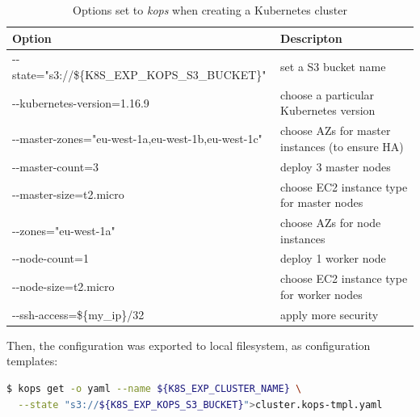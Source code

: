 \begin{table}[H]
\captionsetup{justification=centering}
\caption{\label{tab:kops-production-options}Options set to \textit{kops} when creating a Kubernetes cluster}
\small
\begin{tabularx}{1\textwidth} {
  | >{\centering\arraybackslash}X
  | >{\centering\arraybackslash}X | }
 \hline
  \textbf{Option} & \textbf{Descripton}  \\
 \hline
 -{}-state="s3://\$\{K8S\_EXP\_KOPS\_S3\_BUCKET\}"  & set a S3 bucket name \\
 \hline
 -{}-kubernetes-version=1.16.9  & choose a particular Kubernetes version \\
 \hline
 -{}-master-zones="eu-west-1a,eu-west-1b,eu-west-1c"  & choose AZs for master instances (to ensure HA) \\
 \hline
 -{}-master-count=3  & deploy 3 master nodes \\
 \hline
 -{}-master-size=t2.micro  & choose EC2 instance type for master nodes \\
 \hline
 -{}-zones="eu-west-1a"  & choose AZs for node instances \\
 \hline
 -{}-node-count=1  & deploy 1 worker node \\
 \hline
 -{}-node-size=t2.micro  & choose EC2 instance type for worker nodes \\
 \hline
 -{}-ssh-access=\$\{my\_ip\}/32  & apply more security \\
 \hline
\end{tabularx}
\end{table}


Then, the configuration was exported to local filesystem, as configuration templates:
\begin{lstlisting}[basicstyle=\small,xleftmargin=0cm,label=lst:5-eksctl-kops-prod-get-yaml,caption={Command used export \textit{kops} configuration from S3 to a local file},captionpos=b,language=Bash]
$ kops get -o yaml --name ${K8S_EXP_CLUSTER_NAME} \
  --state "s3://${K8S_EXP_KOPS_S3_BUCKET}">cluster.kops-tmpl.yaml
\end{lstlisting}

